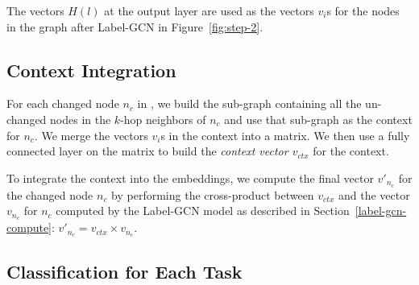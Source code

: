 The vectors $H(l)$ at the output layer are used as the vectors $v_i$s
for the nodes in the {\mvpdgxy} graph after Label-GCN in Figure~\ref{fig:step-2}.





\subsection{Context Integration}
\label{context:sec}

For each changed node $n_c$ in {\mvpdgxy}, we build the sub-graph
containing all the un-changed nodes in the $k$-hop neighbors of $n_c$
and use that sub-graph as the context for $n_c$. We merge the vectors $v_i$s
in the context into a matrix. We then use a fully connected layer on
the matrix to build the {\em context vector $v_{ctx}$} for
the context.

To integrate the context into the embeddings, we compute the final
vector $v{'}_{n_{c}}$ for the changed node $n_c$ by performing the
cross-product between $v_{ctx}$ and the vector $v_{n_c}$ for $n_c$
computed by the Label-GCN model as described in
Section~\ref{label-gcn-compute}: $v{'}_{n_c} = v_{ctx} \times
v_{n_c}$.

\subsection{Classification for Each Task}
\label{class:sec}

